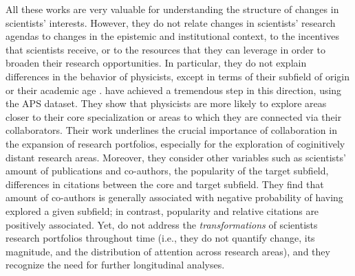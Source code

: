 \documentclass{article}
\begin{document}
All these works are very valuable for understanding the structure of changes in scientists' interests. %
However, they do not relate changes in scientists' research agendas to changes in the epistemic and institutional context, to the incentives that scientists receive, or to the resources that they can leverage in order to broaden their research opportunities. In particular, they do not explain differences in the behavior of physicists, except in terms of their subfield of origin or their academic age \citep{Zeng2019,Aleta2019}. \citet{Tripodi2020} have achieved a tremendous step in this direction, using the APS dataset. They show that physicists are more likely to explore areas closer to their core specialization or areas to which they are connected via their collaborators.
Their work underlines the crucial importance of collaboration in the expansion of research portfolios, especially for the exploration of coginitively distant research areas. Moreover, they consider other variables such as scientists' amount of publications and co-authors, the popularity of the target subfield, differences in citations between the core and target subfield. They find that amount of co-authors is generally associated with negative probability of having explored a given subfield; in contrast, popularity and relative citations are positively associated. Yet, \citeauthor{Tripodi2020} do not address the \textit{transformations} of scientists research portfolios throughout time (i.e., they do not quantify change, its magnitude, and the distribution of attention across research areas), and they recognize the need for further longitudinal analyses.
\end{document}
